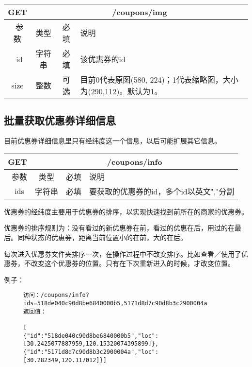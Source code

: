 \begin{table}[H]
   \begin{center}
\begin{tabular}{|c|c|c|p{12cm}|}
\hline
GET & \multicolumn{3}{|c|}{/coupons/img} \\
\hline\hline
 \  参数  & 类型 & 必填 &  说明  \\
\hline
 \  id  & 字符串 & 必填 &  该优惠券的id  \\
\hline
 size  & 整数 & 可选 &  目前0代表原图(580, 224)；1代表缩略图，大小为(290,112)。默认为1。\\ 
\hline
\end{tabular}
   \end{center}
\end{table}



\subsection{批量获取优惠券详细信息}
目前优惠券详细信息里只有经纬度这一个信息，以后可能扩展其它信息。
\begin{table}[H]
   \begin{center}
\begin{tabular}{|c|c|c|p{12cm}|}
\hline
GET & \multicolumn{3}{|c|}{/coupons/info} \\
\hline\hline
 \  参数  & 类型 & 必填 &  说明  \\
\hline
 \  ids  & 字符串 & 必填 &  要获取的优惠券的id，多个id以英文","分割  \\
 \hline
\end{tabular}
   \end{center}
\end{table}

优惠券的经纬度主要用于优惠券的排序，以实现快速找到前所在的商家的优惠券。

优惠券的排序规则为：没有看过的新优惠券在前，看过的优惠在后，用过的在最后。同种状态的优惠券，距离当前位置小的在前，大的在后。

每次进入优惠券文件夹排序一次，在操作过程中不改变排序。比如查看／使用了优惠券，不改变这个优惠券的位置。只有在下次重新进入的时候，才改变位置。

例子：

\begin{figure}[H]
\begin{verbatim}
访问：/coupons/info?ids=518de040c90d8be6840000b5,5171d8d7c90d8b3c2900004a
返回值：

[
{"id":"518de040c90d8be6840000b5","loc":[30.2425077887959,120.15320074395899]},
{"id":"5171d8d7c90d8b3c2900004a","loc":[30.282349,120.117012]}]


\end{verbatim}
\end{figure}








